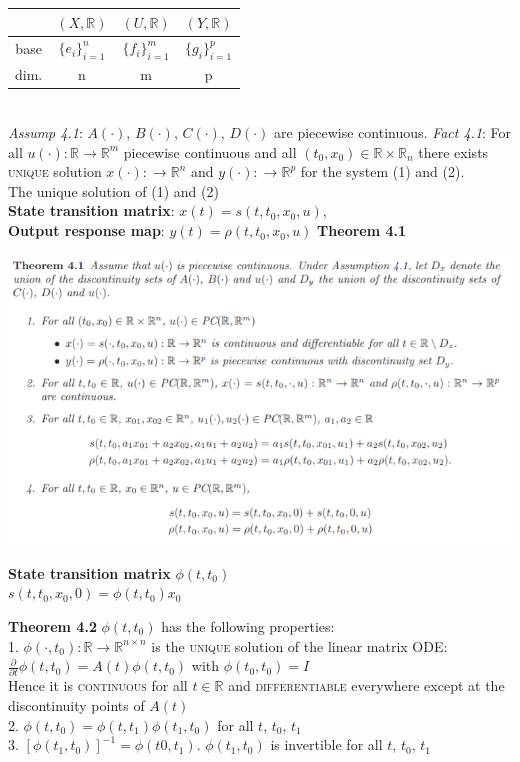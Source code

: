 \documentclass[10pt,landscape]{article}
\newenvironment{Figure}
{\par\medskip\noindent\minipage{\linewidth}}
{\endminipage\par\medskip}
\begin{document}
\begin{multicols*}{4}
\begin{tabular}{|c|c|c|c|}
	\hline
	& $(X, \mathbb{R})$ & $(U, \mathbb{R})$ & $(Y, \mathbb{R})$\\
	\hline
	base & $ \{ e_i \}_{i=1}^n $ & $\{f_i\}_{i=1}^m $ & $\{g_i\}_{i=1}^p $\\
	\hline
	dim. & n & m & p\\
	\hline
\end{tabular}\\
\textit{Assump 4.1}: $A(\cdot)$, $B(\cdot)$, $C(\cdot)$, $D(\cdot)$ are piecewise continuous.
\textit{Fact 4.1}: For all $u(\cdot): \mathbb{R} \rightarrow \mathbb{R}^m$ piecewise continuous and all $(t_0, x_0) \in \mathbb{R} \times \mathbb{R}_n$ there exists \textsc{unique} solution $x(\cdot):  \rightarrow \mathbb{R}^n$ and $y(\cdot):  \rightarrow \mathbb{R}^p$ for the system (1) and (2).\\
The unique solution of (1) and (2)\\
\textbf{State transition matrix}: $x(t) = s(t, t_0, x_0, u)$,\\
\textbf{Output response map}: $y(t) = \rho(t, t_0, x_0, u)$
\textbf{Theorem 4.1}
\begin{Figure}
	\centering
	\includegraphics[width=\linewidth]{pictures/Th4_1.png}
\end{Figure}
\textbf{State transition matrix} $\phi(t, t_0)$ \\
$s(t, t_0, x_0, 0)=\phi(t, t_0)x_0$

\textbf{Theorem 4.2} $\phi(t, t_0)$ has the following properties:\\
1. $\phi(\cdot, t_0): \mathbb{R} \rightarrow \mathbb{R}^{n \times n}$ is the \textsc{unique} solution of the linear matrix ODE:\\
$\frac{\partial}{\partial t}\phi(t, t_0) = A(t)\phi(t, t_0)$ with $\phi(t_0, t_0) = I$\\
Hence it is \textsc{continuous} for all $t \in \mathbb{R}$ and \textsc{differentiable} everywhere except at the discontinuity points of $A(t)$\\
2. $\phi(t, t_0) = \phi(t, t_1)\phi(t_1, t_0)$ for all $t$, $t_0$, $t_1$\\
3. $[ \phi(t_1, t_0)]^{-1} = \phi(t0, t_1)$. $\phi(t_1, t_0)$ is invertible for all $t$, $t_0$, $t_1$ \\


\end{multicols*}
\end{document}
